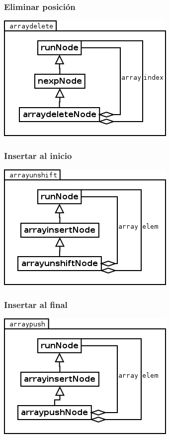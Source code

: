 \subsubsection {Eliminar posición}
\begin{center}
\includegraphics[scale=0.4]{delete.png} \\
\end{center}

\subsubsection {Insertar al inicio}
\begin{center}
\includegraphics[scale=0.4]{unshift.png} \\
\end{center}

\subsubsection {Insertar al final}
\begin{center}
\includegraphics[scale=0.4]{push.png} \\
\end{center}


